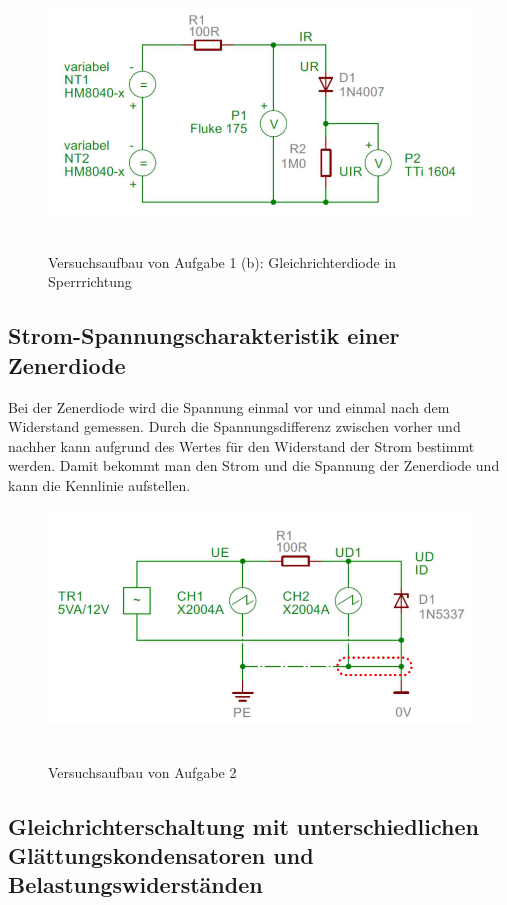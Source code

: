 \documentclass{article}
\begin{document}
\begin{figure}[H]
\caption{Versuchsaufbau von Aufgabe 1 (b): Gleichrichterdiode in Sperrrichtung}
\label{fig:aufbau_task1b}
{\centering
\includegraphics[scale=1.7]{bilder/aufbau_task1b.png}
~
}
\end{figure}

\subsection{Strom-Spannungscharakteristik einer Zenerdiode}

Bei der Zenerdiode wird die Spannung einmal vor und einmal nach dem Widerstand gemessen. Durch die Spannungsdifferenz zwischen vorher und nachher kann aufgrund des Wertes für den Widerstand der Strom bestimmt werden. Damit bekommt man den Strom und die Spannung der Zenerdiode und kann die Kennlinie aufstellen.

\begin{figure}[H]
\caption{Versuchsaufbau von Aufgabe 2}
\label{fig:aufbau_task2}
{\centering
\includegraphics[scale=1.7]{bilder/aufbau_task2.png}
~
}
\end{figure}



\subsection{Gleichrichterschaltung mit unterschiedlichen Glättungskondensatoren und Belastungswiderständen}
\end{document}
